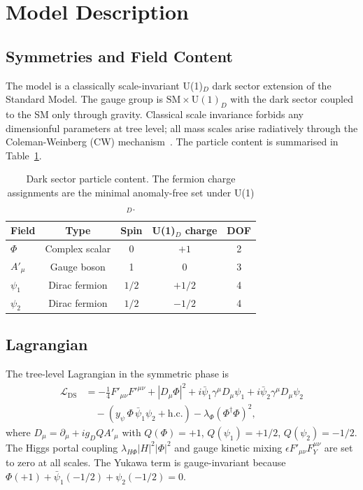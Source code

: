 \documentclass[12pt,a4paper]{article}
\begin{document}
\section{Model Description}
\label{sec:model}

\subsection{Symmetries and Field Content}

The model is a classically scale-invariant U(1)$_D$ dark sector extension of the Standard Model. The gauge group is $\text{SM} \times \text{U}(1)_D$ with the dark sector coupled to the SM only through gravity. Classical scale invariance forbids any dimensionful parameters at tree level; all mass scales arise radiatively through the Coleman-Weinberg (CW) mechanism~\cite{Coleman:1973jx}. The particle content is summarised in Table~\ref{tab:particles}.

\begin{table}[H]
\centering
\caption{Dark sector particle content. The fermion charge assignments are the minimal anomaly-free set under U(1)$_D$.}
\label{tab:particles}
\begin{tabular}{lcccc}
\toprule
Field & Type & Spin & U(1)$_D$ charge & DOF \\
\midrule
$\Phi$ & Complex scalar & 0 & $+1$ & 2 \\
$A'_\mu$ & Gauge boson & 1 & 0 & 3 \\
$\psi_1$ & Dirac fermion & $1/2$ & $+1/2$ & 4 \\
$\psi_2$ & Dirac fermion & $1/2$ & $-1/2$ & 4 \\
\bottomrule
\end{tabular}
\end{table}

\subsection{Lagrangian}

The tree-level Lagrangian in the symmetric phase is
\begin{align}
\mathcal{L}_{\text{DS}} &=
-\frac{1}{4} F'_{\mu\nu} F'^{\mu\nu}
+ |D_\mu\Phi|^2
+ i\bar{\psi}_1 \gamma^\mu D_\mu \psi_1
+ i\bar{\psi}_2 \gamma^\mu D_\mu \psi_2 \nonumber\\
&\quad - \left( y_\psi\, \Phi\, \bar{\psi}_1 \psi_2 + \text{h.c.} \right)
- \lambda_\Phi (\Phi^\dagger \Phi)^2,
\label{eq:lagrangian}
\end{align}
where $D_\mu = \partial_\mu + i g_D Q A'_\mu$ with $Q(\Phi)=+1$, $Q(\psi_1)=+1/2$, $Q(\psi_2)=-1/2$. The Higgs portal coupling $\lambda_{H\Phi}|H|^2|\Phi|^2$ and gauge kinetic mixing $\epsilon F'_{\mu\nu}F^{\mu\nu}_Y$ are set to zero at all scales. The Yukawa term is gauge-invariant because $\Phi (+1) + \bar{\psi}_1(-1/2) + \psi_2(-1/2) = 0$.
\end{document}
